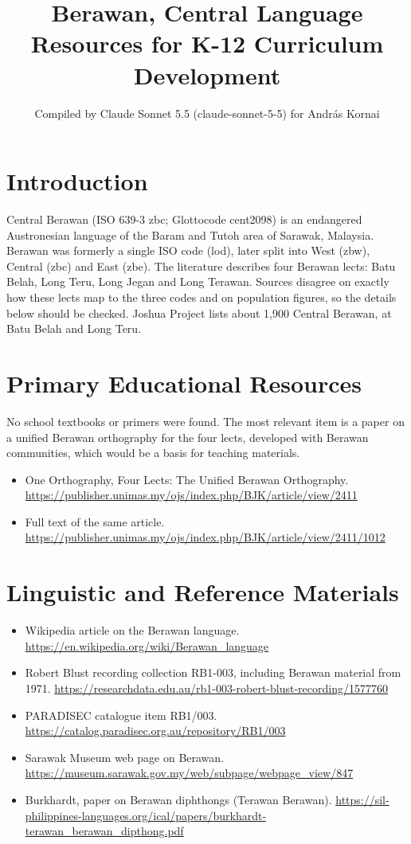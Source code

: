 \documentclass[12pt]{article}
\title{Berawan, Central Language Resources for K-12 Curriculum Development}
\author{Compiled by Claude Sonnet 5.5 (claude-sonnet-5-5) for Andr\'as Kornai}
\date{}
\begin{document}
\maketitle

\section{Introduction}
Central Berawan (ISO 639-3 zbc; Glottocode cent2098) is an endangered Austronesian language of the Baram and Tutoh area of Sarawak, Malaysia. Berawan was formerly a single ISO code (lod), later split into West (zbw), Central (zbc) and East (zbe). The literature describes four Berawan lects: Batu Belah, Long Teru, Long Jegan and Long Terawan. Sources disagree on exactly how these lects map to the three codes and on population figures, so the details below should be checked. Joshua Project lists about 1,900 Central Berawan, at Batu Belah and Long Teru.

\section{Primary Educational Resources}
No school textbooks or primers were found. The most relevant item is a paper on a unified Berawan orthography for the four lects, developed with Berawan communities, which would be a basis for teaching materials.
\begin{itemize}
\item One Orthography, Four Lects: The Unified Berawan Orthography. \url{https://publisher.unimas.my/ojs/index.php/BJK/article/view/2411}
\item Full text of the same article. \url{https://publisher.unimas.my/ojs/index.php/BJK/article/view/2411/1012}
\end{itemize}

\section{Linguistic and Reference Materials}
\begin{itemize}
\item Wikipedia article on the Berawan language. \url{https://en.wikipedia.org/wiki/Berawan_language}
\item Robert Blust recording collection RB1-003, including Berawan material from 1971. \url{https://researchdata.edu.au/rb1-003-robert-blust-recording/1577760}
\item PARADISEC catalogue item RB1/003. \url{https://catalog.paradisec.org.au/repository/RB1/003}
\item Sarawak Museum web page on Berawan. \url{https://museum.sarawak.gov.my/web/subpage/webpage_view/847}
\item Burkhardt, paper on Berawan diphthongs (Terawan Berawan). \url{https://sil-philippines-languages.org/ical/papers/burkhardt-terawan_berawan_dipthong.pdf}
\end{itemize}
\end{document}
